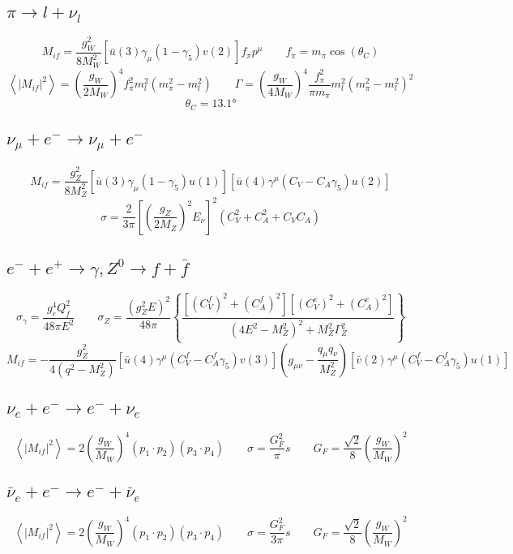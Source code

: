 \documentclass[10pt, onecolumn, a4paper]{article}
\def\({\left(}
\def\){\right)}
\def\[{\left[}
\def\]{\right]}
\def\<{\left<}
\def\>{\right>}
\begin{document}
\subsection{$\pi\to l+\nu_l$} %
$$M_{if}=\frac{g_W^2}{8M_W^2}\[\bar u\(3\)\gamma_{\mu}\(1-\gamma_5\)v\(2\)\]f_{\pi}p^{\mu} \qquad f_{\pi}=m_{\pi}\cos{\(\theta_C\)}$$
$$\<\left|M_{if}\right|^2\>=\(\frac{g_W}{2M_W}\)^4f_{\pi}^2m_l^2\(m_{\pi}^2-m_l^2\) \qquad \Gamma=\(\frac{g_W}{4M_W}\)^4\frac{f_{\pi}^2}{\pi m_{\pi}}m_l^2\(m_{\pi}^2-m_l^2\)^2$$
$$\theta_C=\ang{13.1}$$

\subsection{$\nu_\mu+e^-\to \nu_\mu+e^-$} %
$$M_{if}=\frac{g_Z^2}{8M_Z^2}\[\bar u\(3\)\gamma_{\mu}\(1-\gamma_5\)u\(1\)\] \[\bar u\(4\)\gamma^{\mu}\(C_V-C_A\gamma_5\)u\(2\)\]$$
$$\sigma=\frac{2}{3\pi}\[\(\frac{g_Z}{2M_Z}\)^2E_{\nu}\]^2\(C_V^2+C_A^2+C_VC_A\)$$

\subsection{$e^-+e^+\to \gamma,Z^0\to f+\bar f$} %
$$\sigma_{\gamma}=\frac{g_e^4Q_f^2}{48\pi E^2} \qquad \sigma_Z=\frac{\(g_Z^2E\)^2}{48\pi}\left\{\frac{\[\(C_V^f\)^2+\(C_A^f\)^2\]\[\(C_V^e\)^2+\(C_A^e\)^2\]}{\(4E^2-M_Z^2\)^2+M_Z^2\Gamma_Z^2}\right\}$$
$$M_{if}=-\frac{g_Z^2}{4\(q^2-M_Z^2\)}\[\bar u\(4\)\gamma^{\mu}\(C_V^f-C_A^f\gamma_5\)v\(3\)\]\(g_{\mu\nu}-\frac{q_{\mu}q_{\nu}}{M_Z^2}\)\[\bar v\(2\)\gamma^{\mu}\(C_V^f-C_A^f\gamma_5\)u\(1\)\]$$

\subsection{$\nu_e+e^-\to e^-+\nu_e$} %
$$\<\left|M_{if}\right|^2\>=2\(\frac{g_W}{M_W}\)^4\(p_1\cdot p_2\)\(p_3\cdot p_4\) \qquad \sigma=\frac{G_F^2}{\pi}s \qquad G_F=\frac{\sqrt{2}}{8}\(\frac{g_W}{M_W}\)^2$$

\subsection{$\bar\nu_e+e^-\to e^-+\bar\nu_e$} %
$$\<\left|M_{if}\right|^2\>=2\(\frac{g_W}{M_W}\)^4\(p_1\cdot p_2\)\(p_3\cdot p_4\) \qquad \sigma=\frac{G_F^2}{3\pi}s \qquad G_F=\frac{\sqrt{2}}{8}\(\frac{g_W}{M_W}\)^2$$
\end{document}
